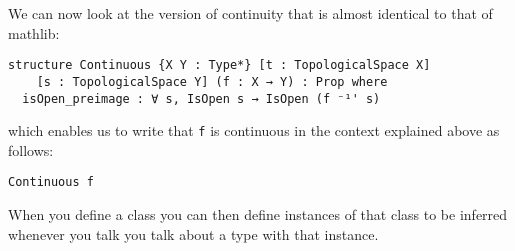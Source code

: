 We can now look at the version of continuity that is almost identical to that of mathlib: 

\begin{lstlisting}
structure Continuous {X Y : Type*} [t : TopologicalSpace X]
    [s : TopologicalSpace Y] (f : X → Y) : Prop where
  isOpen_preimage : ∀ s, IsOpen s → IsOpen (f ⁻¹' s)
\end{lstlisting}

which enables us to write that \lstinline{f} is continuous in the context explained above as follows:

\begin{lstlisting}
Continuous f
\end{lstlisting}

When you define a class you can then define instances of that class to be inferred whenever you talk you talk about a type with that instance. 